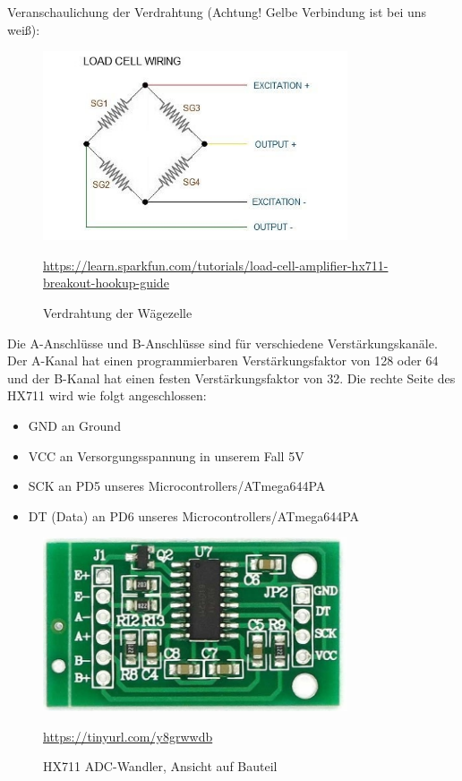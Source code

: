 \newpage
\noindent
Veranschaulichung der Verdrahtung (Achtung! Gelbe Verbindung ist bei uns weiß):\\
\begin{figure}[ht]
    \center
    \includegraphics[width=9cm]{Bilder/waegezelle-verdrahtung.jpg}\\
    \caption{Verdrahtung der Wägezelle }
    \begin{flushleft} \quelle\url{https://learn.sparkfun.com/tutorials/load-cell-amplifier-hx711-breakout-hookup-guide} \end{flushleft}
\end{figure}
Die A-Anschlüsse und B-Anschlüsse sind für verschiedene Verstärkungskanäle. Der A-Kanal hat einen programmierbaren Verstärkungsfaktor von 128 oder 64 und der B-Kanal hat einen festen Verstärkungsfaktor von 32.
\newpage
Die rechte Seite des HX711 wird wie folgt angeschlossen: 
\begin{itemize}
    \item GND an Ground 
    \item VCC an Versorgungsspannung in unserem Fall 5V 
    \item SCK an PD5 unseres Microcontrollers/ATmega644PA 
    \item DT (Data) an PD6 unseres Microcontrollers/ATmega644PA 
\end{itemize}
\begin{figure}[ht]
    \center
    \includegraphics[width=9cm]{Bilder/waegezelle-adc.jpg}\\
    \caption{HX711 ADC-Wandler, Ansicht auf Bauteil}
    \quelle\url{https://tinyurl.com/y8grwwdb}
\end{figure}
